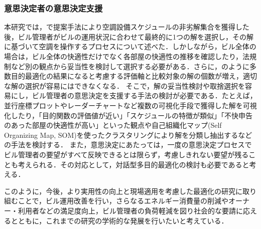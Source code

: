 \subsubsection{意思決定者の意思決定支援}
本研究では，で提案手法により空調設備スケジュールの非劣解集合を獲得した後，ビル管理者がビルの運用状況に合わせて最終的に1つの解を選択し，その解に基づいて空調を操作するプロセスについて述べた．しかしながら，ビル全体の場合は，ビル全体の快適性だけでなく各部屋の快適性の推移を確認したり，法規制など別の観点から妥当性を検討して選択する必要がある．さらに，のように多数目的最適化の結果になると考慮する評価軸と比較対象の解の個数が増え，適切な解の選択が容易にはできなくなる．
そこで，解の妥当性検討や取捨選択を容易にし，ビル管理者の意思決定を支援する手法の検討が必要である．たとえば，並行座標プロットやレーダーチャートなど複数の可視化手段で獲得した解を可視化したり，「目的関数の評価値が近い」「スケジュールの特徴が類似」「不快申告のあった部屋の快適性が高い」といった観点や自己組織化マップ(Self Organizing Map, SOM)を使ったクラスタリングにより解を分類し抽出するなどの手法を検討する．
また，意思決定にあたっては，一度の意思決定プロセスでビル管理者の要望がすべて反映できるとは限らず，考慮しきれない要望が残ることも考えられる．その対応として，対話型多目的最適化の検討も必要であると考える．
\linebreak
\par
このように，今後，より実用性の向上と現場適用を考慮した最適化の研究に取り組むことで，ビル運用改善を行い，さらなるエネルギー消費量の削減やオーナー・利用者などの満足度向上，ビル管理者の負荷軽減を図り社会的な要請に応えるとともに，これまでの研究の学術的な発展を行いたいと考えている．



